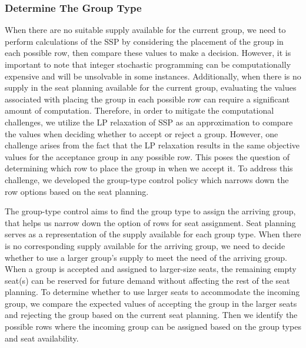 \subsubsection{Determine The Group Type}\label{nested_policy}

When there are no suitable supply available for the current group, we need to perform calculations of the SSP by considering the placement of the group in each possible row, then compare these values to make a decision. However, it is important to note that integer stochastic programming can be computationally expensive and will be unsolvable in some instances. Additionally, when there is no supply in the seat planning available for the current group, evaluating the values associated with placing the group in each possible row can require a significant amount of computation. Therefore, in order to mitigate the computational challenges, we utilize the LP relaxation of SSP as an approximation to compare the values when deciding whether to accept or reject a group. However, one challenge arises from the fact that the LP relaxation results in the same objective values for the acceptance group in any possible row. This poses the question of determining which row to place the group in when we accept it. To address this challenge, we developed the group-type control policy which narrows down the row options based on the seat planning.

The group-type control aims to find the group type to assign the arriving group, that helps us narrow down the option of rows for seat assignment. Seat planning serves as a representation of the supply available for each group type. When there is no corresponding supply available for the arriving group, we need to decide whether to use a larger group's supply to meet the need of the arriving group. When a group is accepted and assigned to larger-size seats, the remaining empty seat(s) can be reserved for future demand without affecting the rest of the seat planning. To determine whether to use larger seats to accommodate the incoming group, we compare the expected values of accepting the group in the larger seats and rejecting the group based on the current seat planning. Then we identify the possible rows where the incoming group can be assigned based on the group types and seat availability.

